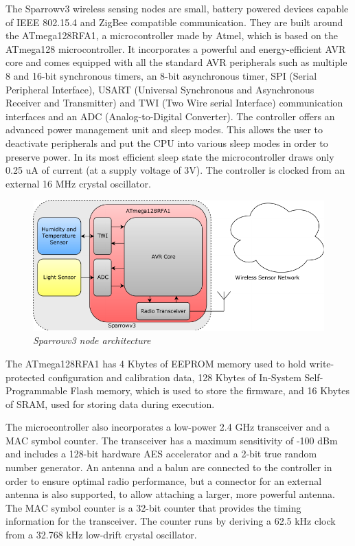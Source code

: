 The Sparrowv3 wireless sensing nodes are small, battery powered devices capable
of IEEE 802.15.4 and ZigBee compatible communication. They are built around the
\mbox{ATmega128RFA1}\cite{atmega128rfa1}, a microcontroller made by Atmel,
which is based on the \mbox{ATmega128} microcontroller. It incorporates a
powerful and energy-efficient AVR core and comes equipped with all the standard
AVR peripherals such as multiple 8 and 16-bit synchronous timers, an 8-bit
asynchronous timer, SPI (Serial Peripheral Interface), USART (Universal
Synchronous and Asynchronous Receiver and Transmitter) and TWI (Two Wire serial
Interface) communication interfaces and an ADC (Analog-to-Digital Converter).
The controller offers an advanced power management unit and sleep modes. This
allows the user to deactivate peripherals and put the CPU into various sleep
modes in order to preserve power. In its most efficient sleep state the
microcontroller draws only 0.25 uA of current (at a supply voltage of 3V). The
controller is clocked from an external 16 MHz crystal oscillator.

\begin{figure}[ht]
	\begin{center}
		\includegraphics[width=\textwidth]{img/sparrowv3_node.pdf}
	\end{center}
	\caption{\small \itshape{Sparrowv3 node architecture}}
\end{figure}

The \mbox{ATmega128RFA1} has 4 Kbytes of EEPROM memory used to hold
write-protected configuration and calibration data, 128 Kbytes of In-System
Self-Programmable Flash memory, which is used to store the firmware, and 16
Kbytes of SRAM, used for storing data during execution.

The microcontroller also incorporates a low-power 2.4 GHz transceiver and a MAC
symbol counter. The transceiver has a maximum sensitivity of -100 dBm and
includes a 128-bit hardware AES accelerator and a 2-bit true random number
generator. An antenna and a balun are connected to the controller in
order to ensure optimal radio performance, but a connector for an external
antenna is also supported, to allow attaching a larger, more powerful antenna.
The MAC symbol counter is a 32-bit counter that provides the timing information
for the transceiver. The counter runs by deriving a 62.5 kHz clock from a
32.768 kHz low-drift crystal oscillator. 

